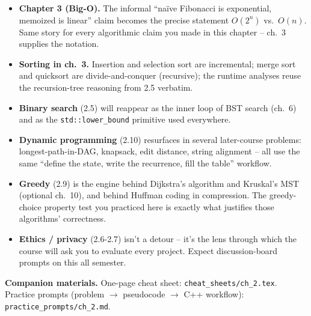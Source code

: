 \documentclass[11pt]{article}
\begin{document}
\begin{notebox}
\begin{itemize}
    \item \textbf{Chapter 3 (Big-O).} The informal ``na\"ive Fibonacci is
    exponential, memoized is linear'' claim becomes the precise
    statement $O(2^n)$ vs.\ $O(n)$. Same story for every algorithmic
    claim you made in this chapter -- ch.~3 supplies the notation.
    \item \textbf{Sorting in ch.~3.} Insertion and selection sort are
    incremental; merge sort and quicksort are divide-and-conquer
    (recursive); the runtime analyses reuse the recursion-tree reasoning
    from 2.5 verbatim.
    \item \textbf{Binary search} (2.5) will reappear as the inner loop
    of BST search (ch.~6) and as the \texttt{std::lower\_bound}
    primitive used everywhere.
    \item \textbf{Dynamic programming} (2.10) resurfaces in several
    later-course problems: longest-path-in-DAG, knapsack, edit
    distance, string alignment -- all use the same ``define the state,
    write the recurrence, fill the table'' workflow.
    \item \textbf{Greedy} (2.9) is the engine behind Dijkstra's algorithm
    and Kruskal's MST (optional ch.~10), and behind Huffman coding in
    compression. The greedy-choice property test you practiced here is
    exactly what justifies those algorithms' correctness.
    \item \textbf{Ethics / privacy} (2.6-2.7) isn't a detour -- it's the
    lens through which the course will ask you to evaluate every project.
    Expect discussion-board prompts on this all semester.
\end{itemize}
\end{notebox}

\textbf{Companion materials.} One-page cheat sheet:
\texttt{cheat\_sheets/ch\_2.tex}. Practice prompts (problem $\to$
pseudocode $\to$ C++ workflow): \texttt{practice\_prompts/ch\_2.md}.
\end{document}
